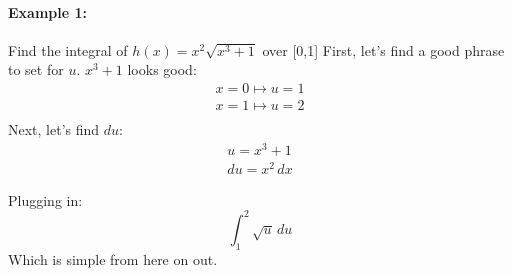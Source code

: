 \documentclass[../revisedmain.tex]{subfiles}
\begin{document}
	\newpage
	\paragraph{Example 1:} Find the integral of $h(x)=x^2\sqrt{x^3+1}$ over [0,1]
	First, let's find a good phrase to set for $u$. $x^3+1$ looks good:
	\begin{gather*}
		x=0\mapsto u=1\\
		x=1\mapsto u=2\\
	\end{gather*}
	Next, let's find $du$:
	\begin{gather*}
	u=x^3+1\\
	du=x^2\, dx
	\end{gather*}

Plugging in:
	\[
	\int_{1}^{2}\sqrt{u}\, du
	\]
	Which is simple from here on out.\\
\end{document}
